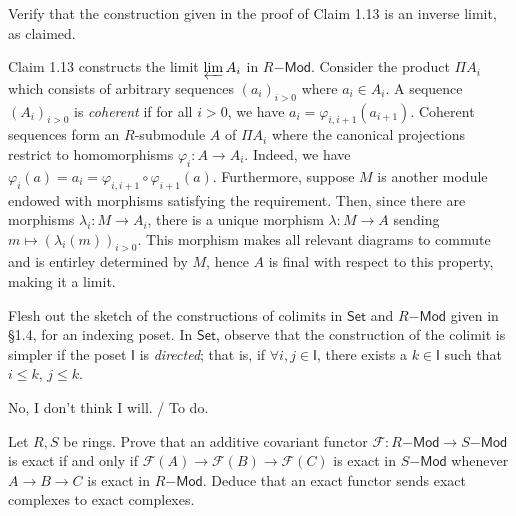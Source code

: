 \documentclass[../../master.tex]{subfiles}
\begin{document}
\begin{problem}
    Verify that the construction given in the proof of Claim 1.13 is an inverse limit, as claimed.
\end{problem}

\begin{solution}
    Claim 1.13 constructs the limit $\varprojlim A_i$ in $R\mathsf{-Mod}$.
    Consider the product $\Pi A_i$ which consists of arbitrary sequences $(a_i)_{i > 0}$ where $a_i \in A_i$.
    A sequence $(A_i)_{i > 0}$ is \textit{coherent} if for all $i > 0$, we have $a_i = \varphi_{i, i+1}(a_{i+1})$.
    Coherent sequences form an $R$-submodule $A$ of $\Pi A_i$ where the canonical projections restrict to homomorphisms $\varphi_i : A \to A_i$.
    Indeed, we have $\varphi_i(a) = a_i = \varphi_{i, i+1} \circ \varphi_{i+1}(a)$.
    Furthermore, suppose $M$ is another module endowed with morphisms satisfying the requirement.
    Then, since there are morphisms $\lambda_i : M \to A_i$, there is a unique morphism $\lambda: M \to A$ sending $m \mapsto (\lambda_i(m))_{i > 0}$.
    This morphism makes all relevant diagrams to commute and is entirley determined by $M$, hence $A$ is final with respect to this property, making it a limit.
\end{solution}

\begin{problem}
    Flesh out the sketch of the constructions of colimits in $\mathsf{Set}$ and $R\mathsf{-Mod}$ given in \S 1.4, for an indexing poset.
    In $\mathsf{Set}$, observe that the construction of the colimit is simpler if the poset $\mathsf{I}$ is \textit{directed};
    that is, if $\forall i, j \in \mathsf{I}$, there exists a $k \in \mathsf{I}$ such that $i \leq k$, $j \leq k$.
\end{problem}

\begin{solution}
    No, I don't think I will. / To do.
\end{solution}

\begin{problem}
    Let $R, S$ be rings.
    Prove that an additive covariant functor $\mathscr{F} : R\mathsf{-Mod} \to S\mathsf{-Mod}$ is exact if and only if $\mathscr{F}(A) \longrightarrow \mathscr{F}(B) \longrightarrow \mathscr{F}(C)$ is exact in $S\mathsf{-Mod}$ whenever $A \longrightarrow B \longrightarrow C$ is exact in $R\mathsf{-Mod}$.
    Deduce that an exact functor sends exact complexes to exact complexes.
\end{problem}
\end{document}
